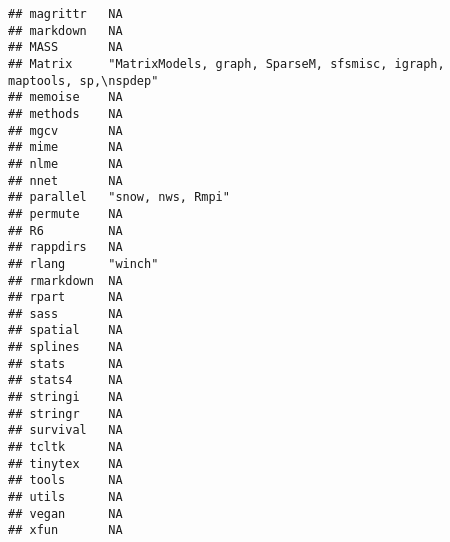 \documentclass[
]{article}
\begin{document}
\begin{verbatim}
## magrittr   NA                                                                   
## markdown   NA                                                                   
## MASS       NA                                                                   
## Matrix     "MatrixModels, graph, SparseM, sfsmisc, igraph, maptools, sp,\nspdep"
## memoise    NA                                                                   
## methods    NA                                                                   
## mgcv       NA                                                                   
## mime       NA                                                                   
## nlme       NA                                                                   
## nnet       NA                                                                   
## parallel   "snow, nws, Rmpi"                                                    
## permute    NA                                                                   
## R6         NA                                                                   
## rappdirs   NA                                                                   
## rlang      "winch"                                                              
## rmarkdown  NA                                                                   
## rpart      NA                                                                   
## sass       NA                                                                   
## spatial    NA                                                                   
## splines    NA                                                                   
## stats      NA                                                                   
## stats4     NA                                                                   
## stringi    NA                                                                   
## stringr    NA                                                                   
## survival   NA                                                                   
## tcltk      NA                                                                   
## tinytex    NA                                                                   
## tools      NA                                                                   
## utils      NA                                                                   
## vegan      NA                                                                   
## xfun       NA                                                                   

\end{verbatim}
\end{document}
